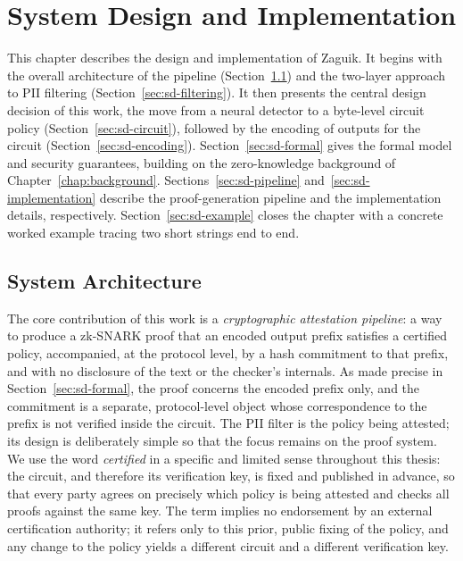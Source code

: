 \chapter{System Design and Implementation}
\label{chap:system-design}

This chapter describes the design and implementation of Zaguik. It begins with the overall architecture of the pipeline (Section~\ref{sec:sd-architecture}) and the two-layer approach to PII filtering (Section~\ref{sec:sd-filtering}). It then presents the central design decision of this work, the move from a neural detector to a byte-level circuit policy (Section~\ref{sec:sd-circuit}), followed by the encoding of outputs for the circuit (Section~\ref{sec:sd-encoding}). Section~\ref{sec:sd-formal} gives the formal model and security guarantees, building on the zero-knowledge background of Chapter~\ref{chap:background}. Sections~\ref{sec:sd-pipeline} and~\ref{sec:sd-implementation} describe the proof-generation pipeline and the implementation details, respectively. Section~\ref{sec:sd-example} closes the chapter with a concrete worked example tracing two short strings end to end.

\section{System Architecture}
\label{sec:sd-architecture}

The core contribution of this work is a \emph{cryptographic attestation pipeline}: a way to produce a zk-SNARK proof that an encoded output prefix satisfies a certified policy, accompanied, at the protocol level, by a hash commitment to that prefix, and with no disclosure of the text or the checker's internals. As made precise in Section~\ref{sec:sd-formal}, the proof concerns the encoded prefix only, and the commitment is a separate, protocol-level object whose correspondence to the prefix is not verified inside the circuit. The PII filter is the policy being attested; its design is deliberately simple so that the focus remains on the proof system. We use the word \emph{certified} in a specific and limited sense throughout this thesis: the circuit, and therefore its verification key, is fixed and published in advance, so that every party agrees on precisely which policy is being attested and checks all proofs against the same key. The term implies no endorsement by an external certification authority; it refers only to this prior, public fixing of the policy, and any change to the policy yields a different circuit and a different verification key.

